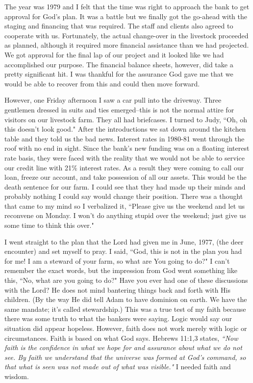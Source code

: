 \documentclass[oneside]{book}
\begin{document}
The year was 1979 and I felt that the time was right to approach the bank to get approval for God's plan. It was a battle but we finally got the go-ahead with the staging and financing that was required. The staff and clients also agreed to cooperate with us. Fortunately, the actual change-over in the livestock proceeded as planned, although it required more financial assistance than we had projected. We got approval for the final lap of our project and it looked like we had accomplished our purpose. The financial balance sheets, however, did take a pretty significant hit. I was thankful for the assurance God gave me that we would be able to recover from this and could then move forward. 

However, one Friday afternoon I saw a car pull into the driveway. Three gentlemen dressed in suits and ties emerged--this is not the normal attire for visitors on our livestock farm. They all had briefcases. I turned to Judy, ``Oh, oh this doesn't look good." After the introductions we sat down around the kitchen table and they told us the bad news. Interest rates in 1980-81 went through the roof with no end in sight. Since the bank's new funding was on a floating interest rate basis, they were faced with the reality that we would not be able to service our credit line with 21\% interest rates. As a result they were coming to call our loan, freeze our account, and take possession of all our assets. This would be the death sentence for our farm. I could see that they had made up their minds and probably nothing I could say would change their position. There was a thought that came to my mind so I verbalized it, ``Please give us the weekend and let us reconvene on Monday. I won't do anything stupid over the weekend; just give us some time to think this over."

I went straight to the plan that the Lord had given me in June, 1977, (the deer encounter) and set myself to pray. I said, ``God, this is not in the plan you had for me!  I am a steward of your farm, so what are You going to do?" I can't remember the exact words, but the impression from God went something like this, ``No, what are you going to do?" Have you ever had one of these discussions with the Lord? He does not mind bantering things back and forth with His children. (By the way He did tell Adam to have dominion on earth. We have the same mandate; it's called stewardship.) This was a true test of my faith because there was some truth to what the bankers were saying. Logic would say our situation did appear hopeless. However, faith does not work merely with logic or circumstances. Faith is based on what God says. Hebrews 11:1,3 states, \textit{``Now faith is the confidence in what we hope for and assurance about what we do not see. By faith we understand that the universe was formed at God's command, so that what is seen was not made out of what was visible."} I needed faith and wisdom. 
\end{document}
